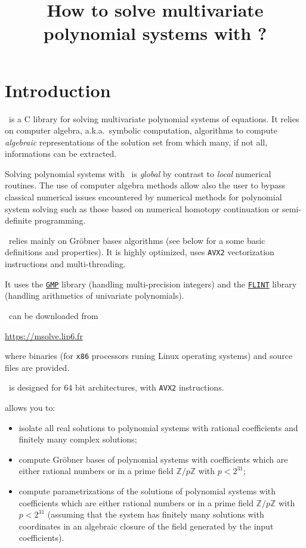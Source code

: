\documentclass[a4paper,english,11pt]{scrartcl}
\title{How to solve multivariate polynomial systems with {\msolve}?}
\date{}
\theoremstyle{definition}
\theoremstyle{remark}
\begin{document}
\maketitle

\tableofcontents

\section{Introduction}

\msolve~is a C library for solving multivariate polynomial systems of equations. 
It relies on computer algebra, a.k.a.\ symbolic computation, algorithms to
compute \emph{algebraic} representations of the solution set from which
many, if not all, informations can be extracted.

Solving polynomial systems with \msolve~is \emph{global} by contrast to
\emph{local} numerical routines. The use of computer algebra methods allow also
the user to bypass classical numerical issues encountered by numerical methods
for polynomial system solving such as those based on numerical homotopy
continuation or semi-definite programming.

\msolve~relies mainly on Gr\"obner bases algorithms (see below for a some basic
definitions and properties). It is highly optimized, uses \texttt{AVX2}
vectorization instructions and multi-threading.

It uses the \href{https://gmplib.org/}{\texttt{GMP}} library (handling
multi-precision integers) and the \href{https://flintlib.org/}{\texttt{FLINT}}
library (handling arithmetics of univariate polynomials).

\msolve~can be downloaded from
\begin{center}
  \url{https://msolve.lip6.fr}
\end{center}
where binaries (for \texttt{x86} processors runing Linux operating systems) and
source files are provided.

\msolve~is designed for $64$ bit architectures, with \texttt{AVX2} instructions. 

\msolve allows you to:
\begin{itemize}
\item isolate all real solutions to polynomial systems with rational
  coefficients and finitely many complex solutions;
\item compute Gr\"obner bases of polynomial systems with coefficients which are
  either rational numbers or in a prime field $\mathbb{Z}/p\mathbb{Z}$ with $p <
  2^{31}$; 
\item compute parametrizations of the solutions of polynomial systems with
  coefficients which are either rational numbers or in a prime field
  $\mathbb{Z}/p\mathbb{Z}$ with $p < 2^{31}$ (assuming that the system has
  finitely many solutions with coordinates in an algebraic closure of the field
  generated by the input coefficients). 
\end{itemize}
\end{document}
